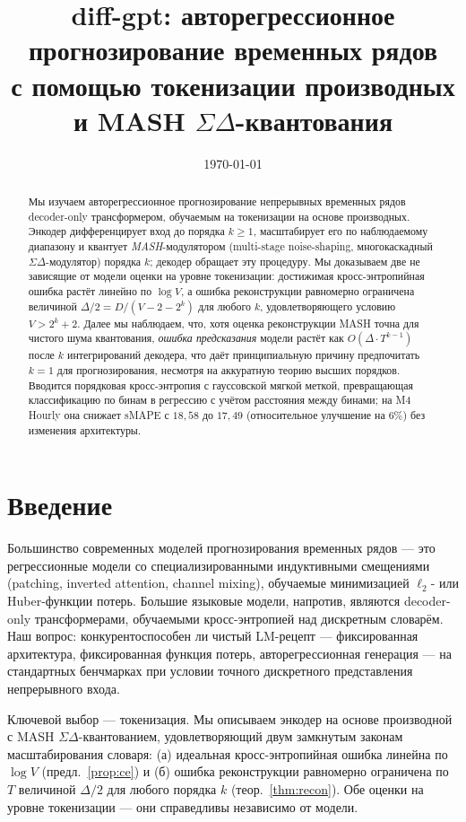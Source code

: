 \documentclass[11pt]{article}
\title{diff-gpt: авторегрессионное прогнозирование временных рядов \\
       с помощью токенизации производных и MASH $\Sigma\Delta$-квантования}
\author{}
\date{\today}
\theoremstyle{remark}
\begin{document}
\maketitle

\begin{abstract}
Мы изучаем авторегрессионное прогнозирование непрерывных временных рядов
decoder-only трансформером, обучаемым на токенизации на основе
производных. Энкодер дифференцирует вход до порядка $k \ge 1$,
масштабирует его по наблюдаемому диапазону и квантует
\emph{MASH}-модулятором (multi-stage noise-shaping, многокаскадный
$\Sigma\Delta$-модулятор) порядка $k$; декодер обращает эту процедуру.
Мы доказываем две не зависящие от модели оценки на уровне токенизации:
достижимая кросс-энтропийная ошибка растёт линейно по $\log V$, а
ошибка реконструкции равномерно ограничена величиной
$\Delta/2 = D/(V - 2 - 2^k)$ для любого $k$, удовлетворяющего
условию $V > 2^k + 2$. Далее мы наблюдаем, что, хотя оценка
реконструкции MASH точна для чистого шума квантования,
\emph{ошибка предсказания} модели растёт как
$O(\Delta \cdot T^{k-1})$ после $k$ интегрирований декодера, что даёт
принципиальную причину предпочитать $k = 1$ для прогнозирования,
несмотря на аккуратную теорию высших порядков. Вводится порядковая
кросс-энтропия с гауссовской мягкой меткой, превращающая классификацию
по бинам в регрессию с учётом расстояния между бинами; на M4 Hourly она
снижает sMAPE с $18{,}58$ до $17{,}49$ (относительное улучшение на 6\%)
без изменения архитектуры.
\end{abstract}

\section{Введение}

Большинство современных моделей прогнозирования временных рядов ---
это регрессионные модели со специализированными индуктивными смещениями
(patching, inverted attention, channel mixing), обучаемые минимизацией
$\ell_2$- или Huber-функции потерь. Большие языковые модели, напротив,
являются decoder-only трансформерами, обучаемыми кросс-энтропией над
дискретным словарём. Наш вопрос: конкурентоспособен ли чистый
LM-рецепт --- фиксированная архитектура, фиксированная функция потерь,
авторегрессионная генерация --- на стандартных бенчмарках при условии
точного дискретного представления непрерывного входа.

Ключевой выбор --- токенизация. Мы описываем энкодер на основе
производной с MASH $\Sigma\Delta$-квантованием, удовлетворяющий двум
замкнутым законам масштабирования словаря: (а) идеальная
кросс-энтропийная ошибка линейна по $\log V$
(предл.~\ref{prop:ce}) и (б) ошибка реконструкции равномерно ограничена
по $T$ величиной $\Delta/2$ для любого порядка $k$
(теор.~\ref{thm:recon}). Обе оценки на уровне токенизации --- они
справедливы независимо от модели.
\end{document}
